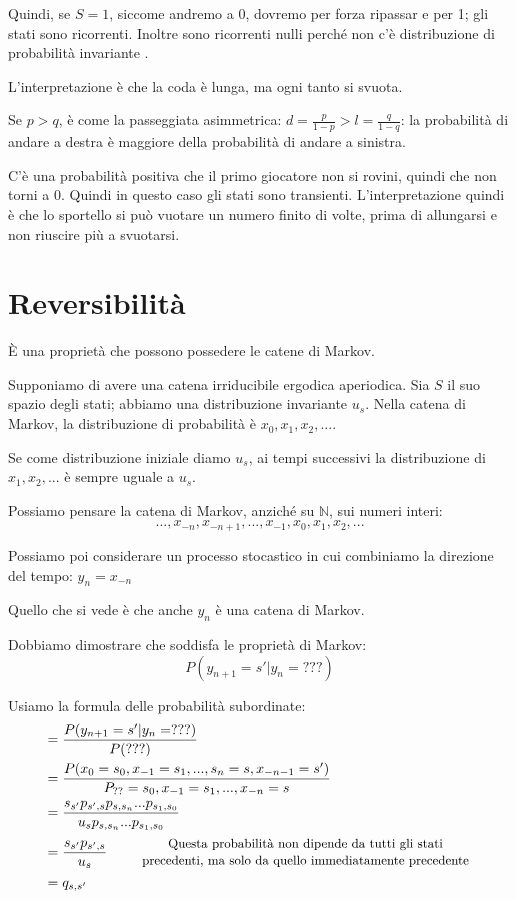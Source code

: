 \documentclass[a4paper,12pt]{book}
\begin{document}
Quindi, se $ S = 1 $, siccome andremo a 0, dovremo per forza ripassar e per 1; gli stati sono ricorrenti. Inoltre sono ricorrenti nulli perché non c'è distribuzione di probabilità invariante . 

L'interpretazione è che la coda è lunga, ma ogni tanto si svuota. 

Se $ p > q $, è come la passeggiata asimmetrica: $ d = \frac{p}{1-p} > l = \frac{q}{1-q} $: la probabilità di andare a destra è maggiore della probabilità di andare a sinistra. 

C'è una probabilità positiva che il primo giocatore non si rovini, quindi che non torni a 0. Quindi in questo caso gli stati sono transienti. L'interpretazione quindi è che lo sportello si può vuotare un numero finito di volte, prima di allungarsi e non riuscire più a svuotarsi. 

\section{Reversibilità}
È una proprietà che possono possedere le catene di Markov. 

Supponiamo di avere una catena irriducibile ergodica aperiodica. Sia $ S $ il suo spazio degli stati; abbiamo una distribuzione invariante $ u_s $. Nella catena di Markov, la distribuzione di probabilità è $ x_0, x_1, x_2, ... $.

Se come distribuzione iniziale diamo $ u_s $, ai tempi successivi la distribuzione di $ x_1, x_2, ... $ è sempre uguale a $ u_s $.

Possiamo pensare la catena di Markov, anziché su $ \mathbb{N} $, sui numeri interi:
$$  ..., x_{-n}, x_{-n+1}, ..., x_{-1}, x_0, x_1, x_2, ... $$

Possiamo poi considerare un processo stocastico in cui combiniamo la direzione del tempo: $ y_n = x_{-n} $

Quello che si vede è che anche $ y_n $ è una catena di Markov. 

Dobbiamo dimostrare che soddisfa le proprietà di Markov:
$$ P (y_{n+1} = s' | y_{n} = ???) $$ %

Usiamo la formula delle probabilità subordinate:
\begin{align*}
	& = \frac{P(y_{n+1} = s' | y_n = ???)}{P(???)} \\ %
	& = \frac{P(x_0=s_0, x_{-1} = s_1, ..., s_n = s, x_{-n-1} = s')}{P_{??} = s_0, x_{-1} = s_1, ..., x_{-n} = s} \\
	& = \frac{s_{s'}p_{s',s} p_{s,s_n}...p_{s_1, s_0}}{u_s p_{s,s_n}...p_{s_1, s_0}} \\
	& = \frac{s_{s'} p_{s',s}}{u_s} \qquad \begin{array}{c}
		\text{\small Questa probabilità non dipende da tutti gli stati} \\ 
		\text{\small precedenti, ma solo da quello immediatamente precedente} 
	\end{array} \\
	& = q_{s,s'}
\end{align*}
\end{document}
